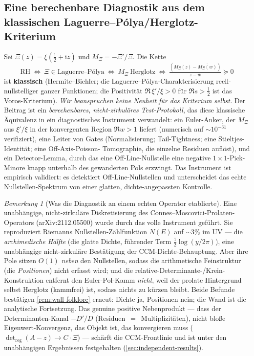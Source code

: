 \documentclass[12pt,a4paper]{article}
\theoremstyle{definition}
\theoremstyle{remark}
\newtheorem{remark}[theorem]{Bemerkung}
\begin{document}
\subsection{Eine berechenbare Diagnostik aus dem klassischen Laguerre--P\'olya/Herglotz-Kriterium}
\label{sec:diagnostic}

Sei $\Xi(z)=\xi(\tfrac12+\mathrm{i}z)$ und $M_\Xi=-\Xi'/\Xi$. Die Kette
\[
\mathrm{RH}\ \Longleftrightarrow\ \Xi\in\text{Laguerre--P\'olya}
\ \Longleftrightarrow\ M_\Xi\ \text{Herglotz}
\ \Longleftrightarrow\ \tfrac{(M_\Xi(z)-\overline{M_\Xi(w)})}{z-\bar w}\succeq 0
\]
ist \textbf{klassisch} (Hermite--Biehler; die Laguerre--P\'olya-Charakterisierung
reell-nullstelliger ganzer Funktionen; die Positivität $\Re\,\xi'/\xi>0$ für
$\Re s>\tfrac12$ ist das Voros-Kriterium). \emph{Wir beanspruchen keine Neuheit für
das Kriterium selbst.} Der Beitrag ist ein \emph{berechenbares, nicht-zirkuläres
Test-Protokoll}, das diese klassische Äquivalenz in ein diagnostisches Instrument
verwandelt: ein Euler-Anker, der $M_\Xi$ aus $\xi'/\xi$ in der konvergenten Region
$\Re w>1$ liefert (numerisch auf $\sim 10^{-31}$ verifiziert), eine Leiter von Gates
(Normalisierung; Tail-Tightness; eine Stieltjes-Identität; eine Off-Axis-Poisson-
Tomographie, die einzelne Residuen auflöst), und ein Detector-Lemma, durch das eine
Off-Line-Nullstelle eine negative $1\times1$-Pick-Minore knapp unterhalb des
gewanderten Pols erzwingt. Das Instrument ist empirisch validiert: es detektiert
Off-Line-Nullstellen und unterscheidet das echte Nullstellen-Spektrum von einer
glatten, dichte-angepassten Kontrolle.

\begin{remark}[Was die Diagnostik an einem echten Operator etablierte]
Eine unabhängige, nicht-zirkuläre Diskretisierung des Connes--Moscovici-Prolaten-
Operators (arXiv:2112.05500) wurde durch das volle Instrument geführt. Sie
reproduziert Riemanns Nullstellen-Zählfunktion $N(E)$ auf $\sim 3\%$ im UV --- die
\emph{archimedische Hälfte} (die glatte Dichte, führender Term
$\tfrac12\log(y/2\pi)$), eine unabhängige nicht-zirkuläre Bestätigung der
CCM-Dichte-Behauptung. Aber ihre Pole sitzen $O(1)$ \emph{neben} den Nullstellen,
sodass die arithmetische Feinstruktur (die \emph{Positionen}) nicht erfasst wird; und
die relative-Determinante-/Krein-Konstruktion entfernt den Euler-Pol-Kamm
\emph{nicht}, weil der prolate Hintergrund selbst Herglotz (kammfrei) ist, sodass
nichts zu kürzen bleibt. Beide Befunde bestätigen \cref{rem:wall-folklore} erneut:
Dichte ja, Positionen nein; die Wand ist die analytische Fortsetzung. Das genuine
positive Nebenprodukt --- dass der Determinanten-Kanal $-D'/D$
(Residuen~$=$~Multiplizitäten), nicht bloße Eigenwert-Konvergenz, das Objekt ist, das
konvergieren muss ($\det_{\mathrm{reg}}(A-z)\to C\cdot\Xi$) --- schärft die
CCM-Frontlinie und ist unter den unabhängigen Ergebnissen festgehalten
(\cref{sec:independent-results}).
\end{remark}
\end{document}
